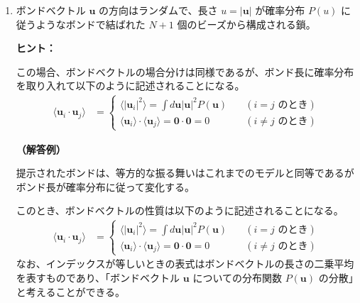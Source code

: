 \documentclass[uplatex,dvipdfmx,a4paper,11pt]{jsarticle}
\begin{document}
\begin{enumerate}
\newpage

\item
ボンドベクトル $\bm{u}$ の方向はランダムで、長さ $u = |\bm{u}|$ が確率分布 $P(u)$ に従うようなボンドで結ばれた $N+1$ 個のビーズから構成される鎖。

\vspace{10pt}
\begin{itembox}[l]{{\bf ヒント：}}

この場合、ボンドベクトルの場合分けは同様であるが、ボンド長に確率分布を取り入れて以下のように記述されることになる。
\begin{align*}
\langle \bm{u}_i \cdot \bm{u}_j \rangle 
	&=
\begin{cases}
\langle |\bm{u}_i |^2 \rangle = \displaystyle \int d \bm{u}  \vert \bm{u} \vert^2 P(\bm{u}) 	&\quad (\text{$i = j$ のとき}) \\
\langle \bm{u}_i \rangle \cdot \langle \bm{u}_j \rangle = \bm{0}\cdot\bm{0} = 0	&\quad(\text{$i \neq j$ のとき})
\end{cases}
\end{align*}
\end{itembox}


{\bf （解答例）}

提示されたボンドは、等方的な振る舞いはこれまでのモデルと同等であるがボンド長が確率分布に従って変化する。
%

このとき、ボンドベクトルの性質は以下のように記述されることになる。
\begin{align*}
\langle \bm{u}_i \cdot \bm{u}_j \rangle 
	&=
\begin{cases}
\langle |\bm{u}_i |^2 \rangle = \displaystyle \int d \bm{u}  \vert \bm{u} \vert^2 P(\bm{u}) 	&\quad (\text{$i = j$ のとき}) \\
\langle \bm{u}_i \rangle \cdot \langle \bm{u}_j \rangle = \bm{0}\cdot\bm{0} = 0	&\quad(\text{$i \neq j$ のとき})
\end{cases}
\end{align*}
なお、インデックスが等しいときの表式はボンドベクトルの長さの二乗平均を表すものであり、「ボンドベクトル $\bm{u}$ についての分布関数 $P(\bm{u})$ の分散」と考えることができる。


\end{enumerate}
\end{document}
